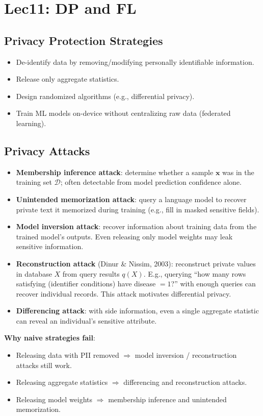 \documentclass[UTF8]{ctexart}
\begin{document}
\newpage

\section{Lec11: DP and FL}
\subsection{Privacy Protection Strategies}
\begin{itemize}
    \item De-identify data by removing/modifying personally identifiable information.
    \item Release only aggregate statistics.
    \item Design randomized algorithms (e.g., differential privacy).
    \item Train ML models on-device without centralizing raw data (federated learning).
\end{itemize}

\subsection{Privacy Attacks}
\begin{itemize}
    \item \textbf{Membership inference attack}: determine whether a sample $\mathbf{x}$ was in the training set $\mathcal{D}$; often detectable from model prediction confidence alone.
    \item \textbf{Unintended memorization attack}: query a language model to recover private text it memorized during training (e.g., fill in masked sensitive fields).
    \item \textbf{Model inversion attack}: recover information about training data from the trained model's outputs. Even releasing only model weights may leak sensitive information.
    \item \textbf{Reconstruction attack} (Dinur \& Nissim, 2003): reconstruct private values in database $X$ from query results $q(X)$. E.g., querying ``how many rows satisfying (identifier conditions) have disease $= 1$?'' with enough queries can recover individual records. This attack motivates differential privacy.
    \item \textbf{Differencing attack}: with side information, even a single aggregate statistic can reveal an individual's sensitive attribute.
\end{itemize}

\textbf{Why naive strategies fail}:
\begin{itemize}
    \item Releasing data with PII removed $\Rightarrow$ model inversion / reconstruction attacks still work.
    \item Releasing aggregate statistics $\Rightarrow$ differencing and reconstruction attacks.
    \item Releasing model weights $\Rightarrow$ membership inference and unintended memorization.
\end{itemize}
\end{document}
